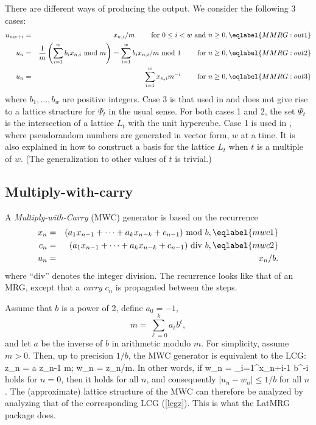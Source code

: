There are different ways of producing the output.
We consider the following 3 cases:
\begin {eqnarray}
 u_{nw+i} &=& x_{n,i} / m \qquad\mbox{ for $0\le i<w$ and $n\ge 0$},
                                                      \eqlabel {MMRG:out1} \\
 u_{n}    &=& {1\over m} \left(\sum_{i=1}^w b_i x_{n,i} \mod m\right) 
           = \sum_{i=1}^w b_i x_{n,i} / m \mod 1
                        \qquad\mbox{ for $n\ge 0$},   \eqlabel {MMRG:out2} \\
 u_{n}    &=& \sum_{i=1}^w x_{n,i} m^{-i} 
                        \qquad\mbox{ for $n\ge 0$},   \eqlabel {MMRG:out3}
\end {eqnarray}
where $b_1,\dots,b_w$ are positive integers.
Case 3 is that used in \cite{rNIE95b} and does not give
rise to a lattice structure for $\Psi_t$ in the usual sense.
For both cases 1 and 2, the set $\Psi_t$ is the intersection of a lattice
$L_t$ with the unit hypercube.
Case 1 is used in \cite{rNIE95c}, where pseudorandom numbers are
generated in vector form, $w$ at a time.
It is also explained in \cite{rNIE95c} how to construct a basis for
the lattice $L_t$ when $t$ is a multiple of $w$.
(The generalization to other values of $t$ is trivial.)



\subsection {Multiply-with-carry}

A {\em Multiply-with-Carry\/} (MWC) generator 
\cite{rCOU95a,rCOU97a,rKOC95a,rMAR94a} is based on the recurrence
\begin{eqnarray}
  x_n &=& (a_1 x_{n-1} + \cdots + a_k x_{n-k} + c_{n-1}) \mod b,
                                                          \eqlabel {mwc1} \\
  c_n &=& (a_1 x_{n-1} + \cdots + a_k x_{n-k} + c_{n-1}) \div b,
                                                          \eqlabel {mwc2} \\
  u_n &=& x_n / b. \nonumber
\end {eqnarray}
where ``div'' denotes the integer division.
The recurrence looks like that of an MRG, except
that a {\em carry\/} $c_n$ is propagated between the steps.

Assume that $b$ is a power of 2, define $a_0 = -1$,
 $$ m = \sum_{\ell=0}^k a_\ell b^\ell, $$
and let $a$ be the inverse of $b$ in arithmetic modulo $m$.
For simplicity, assume $m > 0$.
Then, up to precision $1/b$, the MWC generator is equivalent to the LCG:
\eq
  z_n = a z_{n-1} \mod m;  \qquad  w_n = z_n/m.             
\endeq
In other words, if 
\eq
  w_n = \sum_{i=1}^\infty x_{n+i-1} b^{-i}                
\endeq
holds for $n=0$, then it holds for all $n$, and consequently
$|u_n - w_n| \le 1/b$ for all $n$.
The (approximate) lattice structure of the MWC can therefore be 
analyzed by analyzing that of the corresponding LCG (\ref{lcgz}).
This is what the LatMRG package does.

